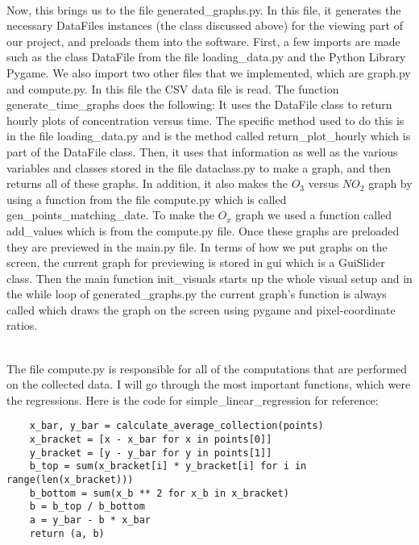 \documentclass[fontsize=11pt]{article}
\begin{document}
\\
Now, this brings us to the file generated\_graphs.py. In this file, it generates the necessary DataFiles instances (the class discussed above) for the viewing part of our project, and preloads them into the software. First, a few imports are made such as the class DataFile from the file loading\_data.py and the Python Library Pygame. We also import two other files that we implemented, which are graph.py and compute.py. In this file the CSV data file is read. The function generate\_time\_graphs does the following: It uses the DataFile class to return hourly plots of concentration versus time. The specific method used to do this is in the file loading\_data.py and is the method called return\_plot\_hourly which is part of the DataFile class. Then, it uses that information as well as the various variables and classes stored in the file dataclass.py to make a graph, and then returns all of these graphs. In addition, it also makes the $O_{3}$ versus $NO_{2}$ graph by using a function from the file compute.py which is called gen\_points\_matching\_date.  To make the $O_{x}$ graph we used a function called add\_values which is from the compute.py file. Once these graphs are preloaded they are previewed in the main.py file. In terms of how we put graphs on the screen, the current graph for previewing is stored in gui which is a GuiSlider class. Then the main function init\_visuals starts up the whole visual setup and in the while loop of generated\_graphs.py the current graph’s function is always called which draws the graph on the screen using pygame and pixel-coordinate ratios. 





\\The file compute.py is responsible for all of the computations that are performed on the collected data. I will go through the most important functions, which were the regressions. Here is the code for simple\_linear\_regression for reference:
\begin{verbatim}
    x_bar, y_bar = calculate_average_collection(points)
    x_bracket = [x - x_bar for x in points[0]]
    y_bracket = [y - y_bar for y in points[1]]
    b_top = sum(x_bracket[i] * y_bracket[i] for i in range(len(x_bracket)))
    b_bottom = sum(x_b ** 2 for x_b in x_bracket)
    b = b_top / b_bottom
    a = y_bar - b * x_bar
    return (a, b)
\end{verbatim}
\end{document}
